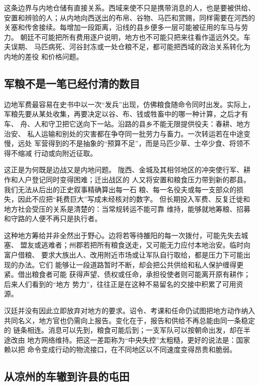 这条边界与内地仓储有直接关系。西域来使不只是携带消息的人，也是要被供给、
安置和辨验的人；从内地向西送出的布帛、谷物、马匹和赏赐，同样需要在河西的
关塞和传舍接续。每增加一段距离，沿线的县乡便多一层可能被征用的车马与劳力。
朝廷不可能把所有费用逐户说明，地方也不可能只把来往看作遥远外交。车夫误期、
马匹病死、河谷封冻或一处仓粮不足，都可能把西域的政治关系转化为内地的差役
和价格问题。

\subsection{军粮不是一笔已经付清的数目}

边地军费最容易在史书中以一次“发兵”出现，仿佛粮食随命令同时出发。实际上，
军粮先要从某处收集，再要决定以谷、布、钱或牲畜中的哪一种计算，之后才有车、
舟、人和守卫把它送向下一站。沿路的县乡不能无限提供役夫：春耕、地方治安、
私人运输和别处的灾害都在争夺同一批劳力与畜力。一次转运若在中途变慢，远处
军营得到的不是抽象的“预算不足”，而是马匹少草、士卒少食、将领不得不缩减
行动或向附近征取。

这正是为何既是边战又是内地问题。
陇西、金城及其相邻地区的冲突使行军、耕作和人户登记同时变得困难；迁出战区的
人又将安置和粮食压力带到新的郡县。我们无法从后出的正史叙事精确算出每一石
粮、每一名役夫或每一支部众的损失，因此不应把“耗费巨大”写成未经核对的数字。
但长期投入军费、反复迁徙和地方社会受压的关系是清楚的：当常规转运不能可靠
维持，能够就地筹粮、招募和守路的人便不再只是执行者。

这种地方筹给并非全然出于野心。边将若等待雒阳的每一次拨付，可能先失去城塞、
盟友或逃难者；州郡若把所有粮食送走，又可能无力应付本地治安。临时向富户借粮、
要求大族出人、改用附近市场或让军队自行取给，都是压力下可能出现的办法。它们
能够让一段道路暂时不断，却会把公共供给和私人保护缠得更紧。借出粮食者可能
获得声望、债权或任命，承担役使者则可能离开原有耕作；后来人们看到的“地方
势力”，往往正是在这种不易留名的交接中积累了可用资源。

汉廷并没有因此立即放弃对地方的要求。诏令、考课和任命仍试图把地方动作纳入
共同名义，地方官也仍需向上报告。变化在于，报告和供给不再总能由同一条稳定的
链条相连。消息可以先到，粮食可能后到；一支军队可以按朝命出发，却在半途改由
地方网络维持。把这一差距称为“中央失控”太粗糙，更好的说法是：国家赖以把
命令变成行动的物流接口，在不同地区以不同速度变得昂贵和脆弱。

\subsection{从凉州的车辙到许县的屯田}

